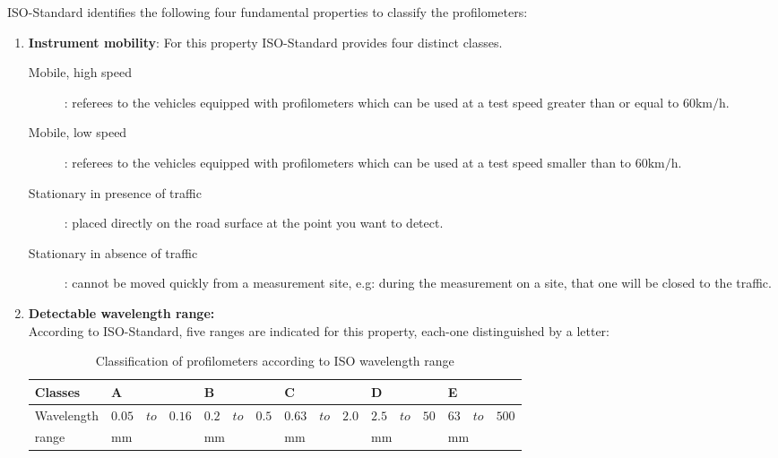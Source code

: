 \documentclass[tesi]{subfiles}
\begin{document}
ISO-Standard\cite{iso_standard} identifies the following four fundamental properties to classify the profilometers:
\begin{enumerate}

\item \textbf{Instrument mobility}: For this property ISO-Standard\cite{iso_standard} provides four distinct classes.
\begin{description}
\item [Mobile, high speed]: referees to the vehicles equipped with profilometers which can be used at a test speed greater than or equal to $\num{60} \si{\km\per\hour}$.
\item [Mobile, low speed]: referees to the vehicles equipped with profilometers which can be used at a test speed smaller than to $\num{60} \si{\km\per\hour}$.
\item [Stationary in presence of traffic]: placed directly on the road surface at the point you want to detect.
\item [Stationary in absence of traffic]: cannot be moved quickly from a measurement site, e.g: during the measurement on a site, that one will be closed to the traffic.
\end{description}

\item \textbf{Detectable wavelength range:}\\ According to ISO-Standard\cite{iso_standard}, five ranges are indicated for this property, each-one distinguished by a letter:

\vspace{0.5cm}
\begin{table}[H]
\centering
    \begin{tabular}{ | l | l | l | l | l | l |}

    \hline
    Classes &\quad A &\quad B &\quad C &\quad D &\quad E \\ \hline
    Wavelength &	$ 0.05 \quad to \quad 0.16$&	$ 0.2 \quad to \quad 0.5$&		$0.63 \quad to \quad 2.0$&	$2.5 \quad to \quad 50$&	$63 \quad to \quad 500$\\
    \quad range &\quad $\si{\milli\meter}$ &\quad  $\si{\milli\meter}$ &\quad  $\si{\milli\meter}$ &\quad  $\si{\milli\meter}$ &\quad  $\si{\milli\meter}$ \\
\hline
    \end{tabular}
 \caption{Classification of profilometers according to ISO wavelength range}
 \label{table:iso_wave}
\end{table}


\end{enumerate}
\end{document}
